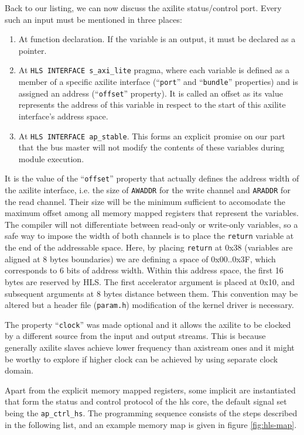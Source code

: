 Back to our listing, we can now discuss the \gls{axilite} status/control port.
Every such an input must be mentioned in three places:
\begin{enumerate}
\item	At function declaration. If the variable is an output, it must be declared as a pointer.
\item	At \texttt{HLS INTERFACE s\_axi\_lite} pragma, where each variable is defined
	as a member of a specific \gls{axilite} interface (``\texttt{port}'' and ``\texttt{bundle}''
	properties) and is assigned an address (``\texttt{offset}'' property). It is called an
	offset as its value represents the address of this variable in respect to the start
	of this \gls{axilite} interface's address space.
\item	At \texttt{HLS INTERFACE ap\_stable}. This forms an explicit promise on our part
	that the bus master will not modify the contents of these variables during module execution.
\end{enumerate}

It is the value of the ``\texttt{offset}'' property that actually defines the address width
of the \gls{axilite} interface, i.e. the size of \texttt{AWADDR} for the write channel
and \texttt{ARADDR} for the read channel. Their size will be the minimum sufficient
to accomodate the maximum offset among all memory mapped registers that represent the variables.
The compiler will not differentiate between read-only or write-only variables, so a safe way
to impose the width of both channels is to place the \texttt{return} variable at the end of
the addressable space. Here, by placing \texttt{return} at 0x38 (variables are aligned at 8 bytes
boundaries) we are defining a space of 0x00..0x3F, which corresponds to 6 bits of address width.
Within this address space, the first 16 bytes are reserved by HLS. The first accelerator
argument is placed at 0x10, and subsequent arguments at 8 bytes distance between them.
This convention may be altered but a header file (\texttt{param.h}) modification
of the kernel driver is necessary.

The property ``\texttt{clock}'' was made optional and it allows the \gls{axilite}
to be clocked by a different source from the input and output streams. 
This is because generally \gls{axilite} slaves achieve lower frequency than \gls{axistream} ones
and it might be worthy to explore if higher clock can be achieved by using separate clock domain.

Apart from the explicit memory mapped registers, some implicit are instantiated 
that form the status and control protocol of the \gls{hls} core, the default signal
set being the \texttt{ap\_ctrl\_hs}. The programming sequence consists of the steps
described in the following list, and an example memory map is given in figure \ref{fig:hls-map}.

